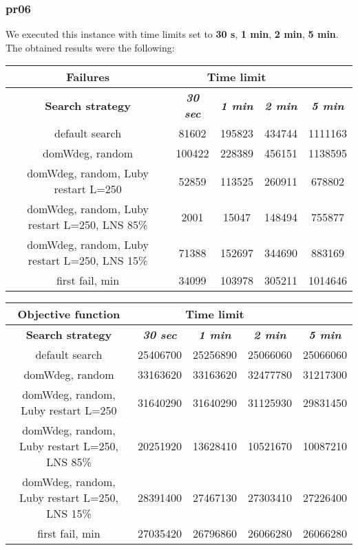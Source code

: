 \subsubsection{pr06}
We executed this instance with time limits set to \textbf{30 s}, \textbf{1 min}, \textbf{2 min}, \textbf{5 min}.\\
The obtained results were the following:
{
\renewcommand{\arraystretch}{2}
\begin{longtable}[h]{| c | c | c | c | c |}
    \hline
    \textbf{Failures} & \multicolumn{3}{c}{Time limit} & \\
    \hline
    \textbf{Search strategy} & \textbf{\textit{30 sec}} & \textbf{\textit{1 min}} & \textbf{\textit{2 min}} & \textbf{\textit{5 min}} \\
    \hline
    \endhead
    default search                                &  81602 & 195823 & 434744 & 1111163 \\
    \hline
    domWdeg, random                               & 100422 & 228389 & 456151 & 1138595 \\
    \hline
    domWdeg, random, Luby restart L=250           &  52859 & 113525 & 260911 &  678802 \\
    \hline
    domWdeg, random, Luby restart L=250, LNS 85\% &   2001 &  15047 & 148494 &  755877 \\
    \hline
    domWdeg, random, Luby restart L=250, LNS 15\% &  71388 & 152697 & 344690 &  883169 \\
    \hline
    first fail, min                               &  34099 & 103978 & 305211 & 1014646 \\
    \hline
\end{longtable}
}

{
\renewcommand{\arraystretch}{2}
\begin{longtable}[h]{| c | c | c | c | c |}
    \hline
    \textbf{Objective function} & \multicolumn{3}{c}{Time limit} & \\
    \hline
    \textbf{Search strategy} & \textbf{\textit{30 sec}} & \textbf{\textit{1 min}} & \textbf{\textit{2 min}} & \textbf{\textit{5 min}} \\
    \hline
    \endhead
    default search                                & 25406700 & 25256890 & 25066060 & 25066060 \\
    \hline
    domWdeg, random                               & 33163620 & 33163620 & 32477780 & 31217300 \\
    \hline
    domWdeg, random, Luby restart L=250           & 31640290 & 31640290 & 31125930 & 29831450 \\
    \hline
    domWdeg, random, Luby restart L=250, LNS 85\% & 20251920 & 13628410 & 10521670 & 10087210 \\
    \hline
    domWdeg, random, Luby restart L=250, LNS 15\% & 28391400 & 27467130 & 27303410 & 27226400 \\
    \hline
    first fail, min                               & 27035420 & 26796860 & 26066280 & 26066280 \\
    \hline
\end{longtable}
}